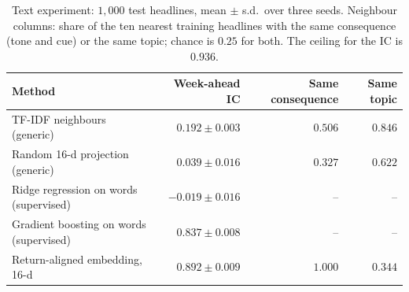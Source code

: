 \documentclass[11pt,a4paper]{article}
\theoremstyle{plain}
\theoremstyle{definition}
\theoremstyle{remark}
\begin{document}
\begin{table}[ht]
\centering
\caption{Text experiment: $1{,}000$ test headlines, mean $\pm$ s.d.\ over three seeds. Neighbour columns: share of the ten nearest training headlines with the same consequence (tone and cue) or the same topic; chance is $0.25$ for both. The ceiling for the IC is $0.936$.}
\label{tab:text}
\small
\begin{tabular}{@{}lrrr@{}}
\toprule
Method & Week-ahead IC & Same consequence & Same topic \\
\midrule
TF-IDF neighbours (generic) & $0.192\pm0.003$ & $0.506$ & $0.846$ \\
Random 16-d projection (generic) & $0.039\pm0.016$ & $0.327$ & $0.622$ \\
Ridge regression on words (supervised) & $-0.019\pm0.016$ & -- & -- \\
Gradient boosting on words (supervised) & $0.837\pm0.008$ & -- & -- \\
Return-aligned embedding, 16-d & $\mathbf{0.892\pm0.009}$ & $\mathbf{1.000}$ & $0.344$ \\
\bottomrule
\end{tabular}
\end{table}
\end{document}
